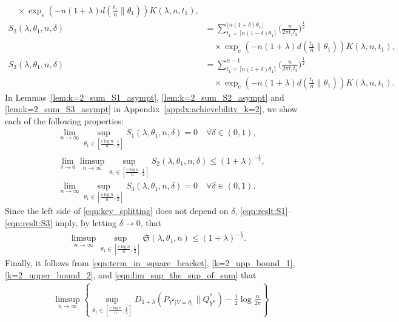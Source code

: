 \documentclass[journal, 10pt]{IEEEtran}
\newcommand{\rme}{\mathrm{e}}
\newcommand{\mfrakS}{\mathfrak{S}}
\theoremstyle{plain}
\theoremstyle{plain}
\theoremstyle{plain}
\theoremstyle{plain}
\begin{document}
\begin{IEEEproof}
\begin{align}
\quad \times \exp_\rme\left(-n(1+\lambda) d\left(\tfrac{t_1}{n}\|\theta_1\right)\right) K(\lambda, n, t_1)\text{,}  \\ 
S_2(\lambda, \theta_1, n, \delta)&= \sum_{t_1=\lceil n(1-\delta)\theta_1 \rceil }^{\lfloor n(1+\delta)\theta_1 \rfloor}  \Big(\frac{n}{2\pi t_1t_2} \Big)^\frac12  \label{eqn:k=2_sum_S2} \\ & \nonumber
\quad \times\exp_\rme\left(-n(1+\lambda) d\left(\tfrac{t_1}{n}\|\theta_1\right)\right)  K(\lambda, n, t_1)\text{,} \\
S_3(\lambda, \theta_1, n, \delta)&= \sum_{t_1=\lceil n(1+\delta)\theta_1 \rceil }^{n-1}   \Big(\frac{n}{2\pi t_1t_2} \Big)^\frac12 \label{eqn:k=2_sum_S3}\\ & \nonumber
\quad \times \exp_\rme\left(-n(1+\lambda) d\left(\tfrac{t_1}{n}\|\theta_1\right)\right) K(\lambda, n, t_1)\text{.} 
\end{align}
In Lemmas~\ref{lem:k=2_sum_S1_asympt}, \ref{lem:k=2_sum_S2_asympt} and \ref{lem:k=2_sum_S3_asympt} in Appendix~\ref{appdx:achievebility_k=2}, we show each of the following properties: 
\begin{align}
&\lim_{n \to \infty} \sup_{\theta_1\in [ \frac{c\log n}{n}, \frac{1}{2} ]} S_1(\lambda, \theta_1, n, \delta) =0 \quad \forall \delta\in (0,1) \text{,} \label{eqn:reslt:S1}  \\
&\lim_{\delta\to 0} \limsup_{n \to \infty} \sup_{\theta_1\in [ \frac{c\log n}{n}, \frac{1}{2} ]} S_2(\lambda, \theta_1, n, \delta) \le (1+\lambda)^{-\frac12 }\text{,} \\
&\lim_{n \to \infty} \sup_{\theta_1\in [ \frac{c\log n}{n}, \frac{1}{2} ]} S_3(\lambda, \theta_1, n, \delta) =0 \quad \forall \delta \in (0,1)\text{.} \label{eqn:reslt:S3}
\end{align}
Since the left side of \eqref{eqn:key_splitting} does not depend on $\delta $, \eqref{eqn:reslt:S1}--\eqref{eqn:reslt:S3} imply, by letting $\delta \to 0 $, that
\begin{align}
 \limsup_{n \to \infty} \sup_{\theta_1\in \left[ \frac{c\log n}{n}, \frac{1}{2} \right]} \mfrakS(\lambda, \theta_1, n) \le (1+\lambda)^{-\frac12}\text{.} \label{eqn:lim_sup_the_sup_of_sum}
\end{align}
Finally, it follows from \eqref{eqn:term_in_square_bracket}, \eqref{k=2_upp_bound_1}, \eqref{k=2_upper_bound_2}, and \eqref{eqn:lim_sup_the_sup_of_sum} that
\begin{align}
&\limsup_{n \to \infty} \left\{  \sup_{\theta_1 \in [ \frac{c\log n}{n}, \frac{1}{2} ]} D_{1+\lambda}(P_{Y^n|V=\theta_1}\| Q^{\ast}_{Y^n}) -\frac{1}{2}\log \frac{n}{2\pi} \right\} \nonumber \\ 

\end{align}
\end{IEEEproof}
\end{document}
